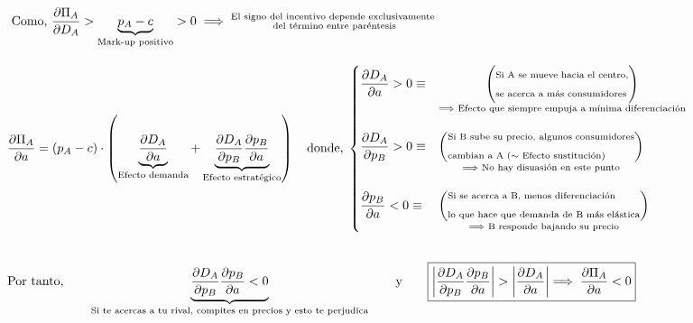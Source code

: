 \documentclass[10pt,a4paper]{article}
\begin{document}
$$\begin{aligned}
    &\text{ Como, $\frac{\partial \Pi_A}{\partial D_A}>\underbrace{p_A-c}_{\text{\scriptsize Mark-up positivo}}>0$}\;\Longrightarrow\;\substack{\text{El signo del incentivo depende exclusivamente}\\\text{ del término entre paréntesis}}\\[1em]
    &\frac{\partial \Pi_A}{\partial a}=(p_A-c)\cdot \left(\underbrace{\frac{\partial D_A}{\partial a}}_{\text{\scriptsize Efecto demanda}}+\underbrace{\frac{\partial D_A}{\partial p_B}\frac{\partial p_B}{\partial a}}_{\text{\scriptsize Efecto estratégico}}\right)\quad \text{donde,}\;
    \left\{\begin{aligned}
        &\frac{\partial D_A}{\partial a}>0\equiv&&
        \underset{\text{\scriptsize $\Longrightarrow$ Efecto que siempre empuja a mínima diferenciación}}{\left(\begin{aligned}
            &\text{\scriptsize Si A se mueve hacia el centro,}\\
            &\text{\scriptsize se acerca a más consumidores}
        \end{aligned}\right)}\\[1em]
        &\frac{\partial D_A}{\partial p_B}>0\equiv&&
        \underset{\text{\scriptsize $\Longrightarrow$ No hay disuasión en este punto}}{\left(\begin{aligned}
            &\text{\scriptsize Si B sube su precio, algunos consumidores}\\
            &\text{\scriptsize cambian a A ($\sim$ Efecto sustitución)}
        \end{aligned}\right)}\\[1em]
        &\frac{\partial p_B}{\partial a}<0\equiv&&
        \underset{\text{\scriptsize $\Longrightarrow$ B responde bajando su precio}}{\left(\begin{aligned}
            &\text{\scriptsize Si se acerca a B, menos diferenciación}\\
            &\text{\scriptsize lo que hace que demanda de B más elástica}
        \end{aligned}\right)}
    \end{aligned}\right.\\[2em]
    &\text{Por tanto,}\qquad \underbrace{\frac{\partial D_A}{\partial p_B}\frac{\partial p_B}{\partial a}<0}_{\text{\scriptsize Si te acercas a tu rival, compites en precios y esto te perjudica}}\qquad \text{y}\qquad \boxed{\left|\frac{\partial D_A}{\partial p_B}\frac{\partial p_B}{\partial a}\right|>\left|\frac{\partial D_A}{\partial a}\right|\Longrightarrow\;\frac{\partial \Pi_A}{\partial a}<0}
\end{aligned}$$
\end{document}
